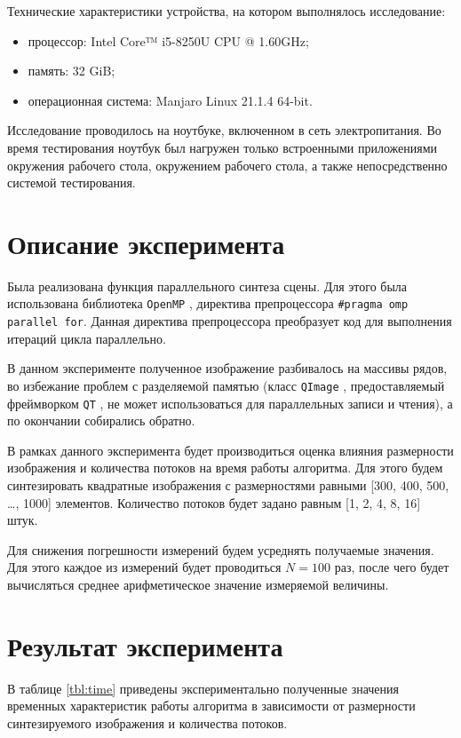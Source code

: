 Технические характеристики устройства, на котором выполнялось исследование:

\begin{itemize}
	\item процессор: Intel Core™ i5-8250U \cite{i5} CPU @ 1.60GHz;
	\item память: 32 GiB;
	\item операционная система: Manjaro \cite{manjaro} Linux \cite{linux} 21.1.4 64-bit.
\end{itemize}

Исследование проводилось на ноутбуке, включенном в сеть электропитания. Во время тестирования ноутбук был нагружен только встроенными приложениями окружения рабочего стола, окружением рабочего стола, а также непосредственно системой тестирования.

\section{Описание эксперимента}

Была реализована функция параллельного синтеза сцены. Для этого была использована библиотека \texttt{OpenMP} \cite{omp}, директива препроцессора \texttt{\#pragma omp parallel for}. Данная директива препроцессора преобразует код для выполнения итераций цикла параллельно. 

В данном эксперименте полученное изображение разбивалось на массивы рядов, во избежание проблем с разделяемой памятью (класс \texttt{QImage} \cite{qimage}, предоставляемый фреймворком \texttt{QT} \cite{qt}, не может использоваться для параллельных записи и чтения), а по окончании собирались обратно.

В рамках данного эксперимента будет производиться оценка влияния размерности изображения и количества потоков на время работы алгоритма. Для этого будем синтезировать квадратные изображения с размерностями равными [300, 400, 500, \dots, 1000] элементов. Количество потоков будет задано равным [1, 2, 4, 8, 16] штук.
 
Для снижения погрешности измерений будем усреднять получаемые значения. Для этого каждое из измерений будет проводиться $N = 100$ раз, после чего будет вычисляться среднее арифметическое значение измеряемой величины.

\section{Результат эксперимента}

В таблице \ref{tbl:time} приведены экспериментально полученные значения временных характеристик работы алгоритма в зависимости от размерности синтезируемого изображения и количества потоков.

